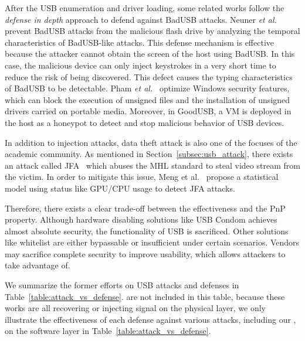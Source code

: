 After the \ac{USB} enumeration and driver loading, some related works follow the \textit{defense in depth} approach to defend against BadUSB attacks.  
Neuner \emph{et al.}~\cite{neuner2018usblock}
prevent BadUSB attacks from the malicious flash drive by analyzing
the temporal characteristics of BadUSB-like attacks. This defense mechanism is
effective because the attacker cannot obtain the screen of the host using
BadUSB. In this case, the malicious device can only inject keystrokes in a very
short time to reduce the risk of being discovered. This defect causes the
typing characteristics of BadUSB to be detectable. Pham \emph{et al.}~\cite{pham2010optimizing} optimize Windows security features, which can
block the execution of unsigned files and the installation of unsigned drivers
carried on portable media. Moreover, in GoodUSB, a VM is deployed in the host as
a honeypot to detect and stop malicious behavior of \ac{USB} devices.

In addition to injection attacks, data theft attack is also one of the focuses
of the academic community. As mentioned in Section~\ref{subsec:usb_attack}, there
exists an attack called JFA~\cite{JFC} which abuses the \ac{MHL}
standard to steal video stream from the victim. In order to mitigate this
issue, Meng et al.~\cite{meng2018252} propose a statistical model using status
like GPU/CPU usage to detect JFA attacks.

Therefore, there exists a clear trade-off between the effectiveness and the
\ac{PnP} property. Although hardware disabling solutions like \ac{USB} Condom
achieves almost absolute security, the functionality of \ac{USB} is sacrificed.
Other solutions like whitelist are either bypassable or insufficient
under certain scenarios. Vendors may sacrifice complete security to
improve usability, which allows attackers to take advantage of.

We summarize the former efforts on \ac{USB} attacks and defenses in
Table~\ref{table:attack_vs_defense}. \cite{usbkiller, cable,smartphone, poweremi,revealing,su2017usb, usbgpslocator, bates2014leveraging, badusbhub, usbfinger, side, usbdriver, usbee, turnip} are not included in this table, because these works are all recovering or injecting signal on the physical layer, we only illustrate the effectiveness of 
each defense against various attacks, including our \tool, on the software layer in Table~\ref{table:attack_vs_defense}. 

